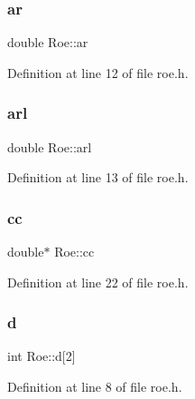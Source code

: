 \subsubsection{\texorpdfstring{ar}{ar}}
{\footnotesize\ttfamily double Roe\+::ar\hspace{0.3cm}{\ttfamily [private]}}



Definition at line 12 of file roe.\+h.

\mbox{\label{classRoe_a639c7fd0b084bc426d2a0f92cb63dae5}} 
\subsubsection{\texorpdfstring{arl}{arl}}
{\footnotesize\ttfamily double Roe\+::arl\hspace{0.3cm}{\ttfamily [private]}}



Definition at line 13 of file roe.\+h.

\mbox{\label{classRoe_a049920de1e32bbe641d180960b9ad49f}} 
\subsubsection{\texorpdfstring{cc}{cc}}
{\footnotesize\ttfamily double$\ast$ Roe\+::cc\hspace{0.3cm}{\ttfamily [private]}}



Definition at line 22 of file roe.\+h.

\mbox{\label{classRoe_a20a2e7114639c312295adad848a9ba06}} 
\subsubsection{\texorpdfstring{d}{d}}
{\footnotesize\ttfamily int Roe\+::d\mbox{[}2\mbox{]}\hspace{0.3cm}{\ttfamily [private]}}



Definition at line 8 of file roe.\+h.

\mbox{\label{classRoe_a02e4884743f77b6b6739fa2dacefd33b}} 
